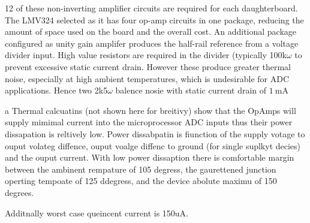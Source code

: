 12 of these non-inverting amplifier circuits are required for each daughterboard.
The LMV324 selected as it has four op-amp circuits in one package, reducing the amount of space used on the board and the overall cost.
An additional package configured as unity gain amplifer produces the half-rail reference from a voltage divider input.
High value resistors are required in the divider (typically 100k$\omega$ to prevent excessive static current drain.
However these produce greater thermal noise, especially at high ambient temperatures, which is undesirable for ADC applications. Hence two 2k5$\omega$ balence nosie with 
static current drain of $\SI{1}{\milli\ampere}$

a 
Thermal calcuatins (not shown here for breitivy) show that the OpAmps will supply mimimal current into the microprocessor ADC inputs thus their power dissapation is reltively low.
Power dissabpatin is fiunction of the supply votage to ouput volateg diffence, ouput voalge diffenc to ground (for single suplkyt decies) and the ouput current.
With low power dissaption there is comfortable margin between the ambinent rempature of 105 degress, the gaurettened junction operting tempoate of 125 ddegress, and the device abolute maximu of 150 degrees.

Additnally worst case queincent current is 150uA.